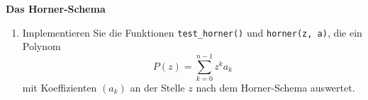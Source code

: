 \textbf{Das Horner-Schema}
\begin{enumerate}
	\item Implementieren Sie die Funktionen \verb|test_horner()| und \verb|horner(z, a)|, die ein Polynom
$$
	P(z) = \sum_{k=0}^{n-1} z^k a_k
$$
mit Koeffizienten $(a_k)$ an der Stelle $z$ nach dem Horner-Schema auswertet.
\end{enumerate}